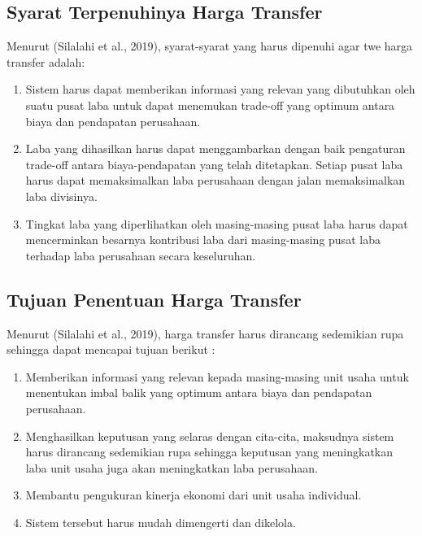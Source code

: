 \subsection{Syarat Terpenuhinya Harga Transfer}

Menurut (Silalahi et al., 2019), syarat-syarat yang harus dipenuhi agar twe harga transfer adalah:

\begin{enumerate}
	\item Sistem harus dapat memberikan informasi yang relevan yang dibutuhkan oleh suatu pusat laba untuk dapat menemukan trade-off yang optimum antara biaya dan pendapatan perusahaan.
	\item Laba yang dihasilkan harus dapat menggambarkan dengan baik pengaturan trade-off antara biaya-pendapatan yang telah ditetapkan. Setiap pusat laba harus dapat memaksimalkan laba perusahaan dengan jalan memaksimalkan laba divisinya.
	\item Tingkat laba yang diperlihatkan oleh masing-masing pusat laba harus dapat mencerminkan besarnya kontribusi laba dari masing-masing pusat laba terhadap laba perusahaan secara keseluruhan.	
\end{enumerate}

\subsection{Tujuan Penentuan Harga Transfer}

Menurut (Silalahi et al., 2019), harga transfer harus dirancang sedemikian rupa sehingga dapat mencapai tujuan berikut :

\begin{enumerate}
	\item Memberikan informasi yang relevan kepada masing-masing unit usaha untuk menentukan imbal balik yang optimum antara biaya dan pendapatan perusahaan.
	\item Menghasilkan keputusan yang selaras dengan cita-cita, maksudnya sistem harus dirancang sedemikian rupa sehingga keputusan yang meningkatkan laba unit usaha juga akan meningkatkan laba perusahaan.
	\item Membantu pengukuran kinerja ekonomi dari unit usaha individual.
	\item Sistem tersebut harus mudah dimengerti dan dikelola.
\end{enumerate}

